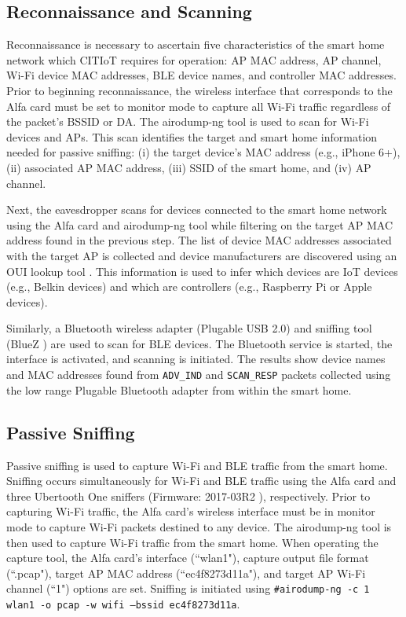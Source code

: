 \documentclass[journal]{./IEEEtran/IEEEtran}
\begin{document}
\subsection{Reconnaissance and Scanning}
\figCitiotDiagramIeee
Reconnaissance is necessary to ascertain five characteristics of the smart home network which \ac{CITIoT} requires for operation: \ac{AP} \ac{MAC} address, \ac{AP} channel, Wi-Fi device \ac{MAC} addresses, \ac{BLE} device names, and controller \ac{MAC} addresses. Prior to beginning reconnaissance, the wireless interface that corresponds to the Alfa card must be set to monitor mode to capture all Wi-Fi traffic regardless of the packet's \ac{BSSID} or \ac{DA}. The airodump-ng tool is used to scan for Wi-Fi devices and \ac{AP}s. This scan identifies the target and smart home information needed for passive sniffing: (i) the target device's \ac{MAC} address (e.g., iPhone 6+), (ii) associated \ac{AP} \ac{MAC} address, (iii) \ac{SSID} of the smart home, and (iv) \ac{AP} channel.

Next, the eavesdropper scans for devices connected to the smart home network using the Alfa card and airodump-ng tool while filtering on the target \ac{AP} \ac{MAC} address found in the previous step. The list of device \ac{MAC} addresses associated with the target \ac{AP} is collected and device manufacturers are discovered using an \ac{OUI} lookup tool \cite{ouiLookup}. This information is used to infer which devices are \ac{IoT} devices (e.g., Belkin devices) and which are controllers (e.g., Raspberry Pi or Apple devices). 

Similarly, a Bluetooth wireless adapter (Plugable USB 2.0) and sniffing tool (BlueZ \cite{Bluez}) are used to scan for \ac{BLE} devices. The Bluetooth service is started, the interface is activated, and scanning is initiated. The results show device names and \ac{MAC} addresses found from \texttt{ADV\_IND} and \texttt{SCAN\_RESP} packets collected using the low range Plugable Bluetooth adapter from within the smart home.

\subsection{Passive Sniffing}

Passive sniffing is used to capture Wi-Fi and \ac{BLE} traffic from the smart home. Sniffing occurs simultaneously for Wi-Fi and \ac{BLE} traffic using the Alfa card and three Ubertooth One sniffers (Firmware: 2017-03R2 \cite{Ubertooth}), respectively. Prior to capturing Wi-Fi traffic, the Alfa card's wireless interface must be in monitor mode to capture Wi-Fi packets destined to any device. The airodump-ng tool is then used to capture Wi-Fi traffic from the smart home. When operating the capture tool, the Alfa card's interface (``wlan1"), capture output file format (``.pcap"), target \ac{AP} \ac{MAC} address (``ec4f8273d11a"), and target \ac{AP} Wi-Fi channel (``1") options are set. Sniffing is initiated using \texttt{\#airodump-ng -c 1 wlan1 -o pcap -w wifi --bssid ec4f8273d11a}.
\end{document}
